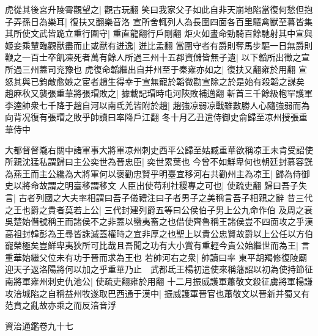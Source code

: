 虎從其後宮升陵霄觀望之|{
	觀古玩翻}
笑曰我家父子如此自非天崩地陷當復何愁但抱子弄孫日為樂耳|{
	復扶又翻樂音洛}
宣所舍輒列人為長圍四面各百里驅禽獸至暮皆集其所使文武皆跪立重行圍守|{
	重直龍翻行戶剛翻}
炬火如晝命勁騎百餘馳射其中宣與姬妾乘輦臨觀獸盡而止或獸有迸逸|{
	迸比孟翻}
當圍守者有爵則奪馬步驅一日無爵則鞭之一百士卒飢凍死者萬有餘人所過三州十五郡資儲皆無孑遺|{
	以下韜所出徵之宣所過三州蓋司兖豫也}
虎復命韜繼出自并州至于秦雍亦如之|{
	復扶又翻雍於用翻}
宣怒其與已鈞敵愈嫉之宦者趙生得幸于宣無寵於韜微勸宣除之於是始有殺韜之謀矣　趙麻秋又襲張重華將張瑁敗之|{
	據載記瑁時屯河陝敗補邁翻}
斬首三千餘級枹罕護軍李逵帥衆七千降于趙自河以南氐羌皆附於趙|{
	趙強凉弱凉戰雖數勝人心隨強弱而為向背况復有張瑁之敗乎帥讀曰率降戶江翻}
冬十月乙丑遣侍御史俞歸至凉州授張重華侍中

大都督督隴右關中諸軍事大將軍凉州刺史西平公歸至姑臧重華欲稱凉王未肯受詔使所親沈猛私謂歸曰主公奕世為晉忠臣|{
	奕世累葉也}
今曾不如鮮卑何也朝廷封慕容皝為燕王而主公纔為大將軍何以褒勸忠賢乎明臺宜移河右共勸州主為凉王|{
	歸為侍御史以將命故謂之明臺移謂移文}
人臣出使苟利社稷專之可也|{
	使疏吏翻}
歸曰吾子失言|{
	古者列國之大夫率相謂曰吾子儀禮注曰子者男子之美稱言吾子相親之辭}
昔三代之王也爵之貴者莫若上公|{
	三代封建列爵五等曰公侯伯子男上公九命作伯}
及周之衰吳楚始僭號稱王而諸侯不之非蓋以蠻夷畜之也借使齊魯稱王諸侯豈不四面攻之乎漢高祖封韓彭為王尋皆誅滅蓋權時之宜非厚之也聖上以貴公忠賢故爵以上公任以方伯寵榮極矣豈鮮卑夷狄所可比哉且吾聞之功有大小賞有重輕今貴公始繼世而為王|{
	言重華始繼父位未有功于晉而求為王也}
若帥河右之衆|{
	帥讀曰率}
東平胡羯修復陵廟迎天子返洛陽將何以加之乎重華乃止　武都氐王楊初遣使來稱藩詔以初為使持節征南將軍雍州刺史仇池公|{
	使疏吏翻雍於用翻}
十二月振威護軍蕭敬文殺征虜將軍楊謙攻涪城陷之自稱益州牧遂取巴西通于漢中|{
	振威護軍晉官也蕭敬文以晉新并蜀又有范賁之亂故亦乘之而反涪音浮}


資治通鑑卷九十七
